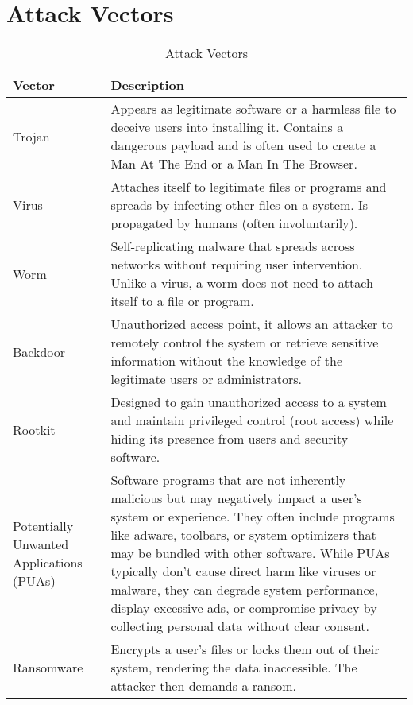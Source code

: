 \section{Attack Vectors}

\begin{table}[H]
    \centering
    \begin{tabular}{|p{3cm}|p{12cm}|}\hline
    \rowcolor{blue!10}
    \textbf{Vector} 
        & \textbf{Description}  
    \\ \hline

    Trojan
        & Appears as legitimate software or a harmless file to deceive users into installing it. Contains a dangerous payload and is often used to create a Man At The End or a Man In The Browser.
    \\ \hline
    
    Virus
        & Attaches itself to legitimate files or programs and spreads by infecting other files on a system. Is propagated by humans (often involuntarily).
    \\ \hline

    Worm
        & Self-replicating malware that spreads across networks without requiring user intervention. Unlike a virus, a worm does not need to attach itself to a file or program.
    \\ \hline

    Backdoor
        & Unauthorized access point, it allows an attacker to remotely control the system or retrieve sensitive information without the knowledge of the legitimate users or administrators.
    \\ \hline

    Rootkit
        & Designed to gain unauthorized access to a system and maintain privileged control (root access) while hiding its presence from users and security software.
    \\ \hline

    Potentially Unwanted Applications (PUAs)
        & Software programs that are not inherently malicious but may negatively impact a user’s system or experience. They often include programs like adware, toolbars, or system optimizers that may be bundled with other software. While PUAs typically don’t cause direct harm like viruses or malware, they can degrade system performance, display excessive ads, or compromise privacy by collecting personal data without clear consent. 
    \\ \hline

    Ransomware 
        & Encrypts a user’s files or locks them out of their system, rendering the data inaccessible. The attacker then demands a ransom.
    \\ \hline



\end{tabular}
\caption{Attack Vectors}
\label{tab:attackVectors}
\end{table}